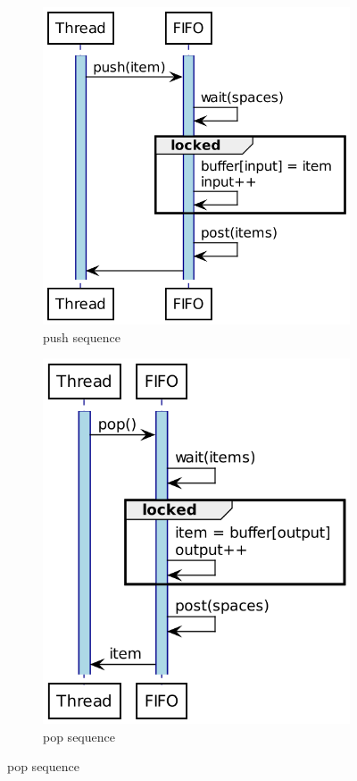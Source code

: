 \documentclass{article}
\begin{document}
    \begin{figure}[H]
        \centering
        \begin{subfigure}[b]{.48\textwidth}
            \centering
            \includegraphics[width=.74\textwidth]{./diagrammes/sequence_push/prodcon-push-sequence.png}
            \caption{push sequence}
        \end{subfigure}
        \begin{subfigure}[b]{.48\textwidth}
            \centering
            \includegraphics[width=.65\textwidth]{./diagrammes/sequence_pop/prodcon-pop-sequence.png}
            \caption{pop sequence}
        \end{subfigure}
    \end{figure}
\end{document}
